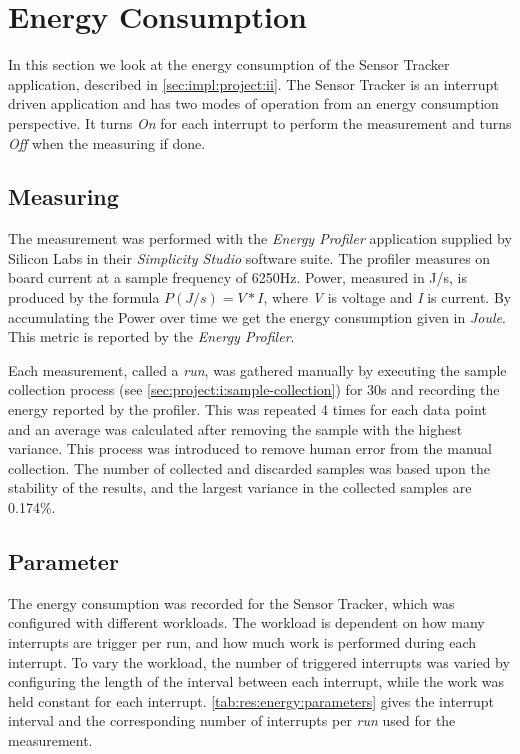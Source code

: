\section{Energy Consumption}

In this section we look at the energy consumption of the Sensor Tracker application, described in \autoref{sec:impl:project:ii}.
The Sensor Tracker is an interrupt driven application and has two modes of operation from an energy consumption perspective.
It turns \emph{On} for each interrupt to perform the measurement and turns \emph{Off} when the measuring if done.

\subsection{Measuring}
The measurement was performed with the \emph{Energy Profiler} application supplied by Silicon Labs in their \emph{Simplicity Studio} software suite.
The profiler measures on board current at a sample frequency of 6250Hz.
Power, measured in J/s, is produced by the formula $P (J/s) = V*I $, where \emph{V} is voltage and \emph{I} is current.
By accumulating the Power over time we get the energy consumption given in \emph{Joule}.
This metric is reported by the \emph{Energy Profiler}.

Each measurement, called a \emph{run}, was gathered manually by executing the sample collection process (see \autoref{sec:project:i:sample-collection}) for 30s and recording the energy reported by the profiler.
This was repeated 4 times for each data point and an average was calculated after removing the sample with the highest variance.
This process was introduced to remove human error from the manual collection.
The number of collected and discarded samples was based upon the stability of the results, and the largest variance in the collected samples are 0.174\%.

\subsection{Parameter}

The energy consumption was recorded for the Sensor Tracker, which was configured with different workloads.
The workload is dependent on how many interrupts are trigger per run, and how much work is performed during each interrupt.
To vary the workload, the number of triggered interrupts was varied by configuring the length of the interval between each interrupt, while the work was held constant for each interrupt.
\autoref{tab:res:energy:parameters} gives the interrupt interval and the corresponding number of interrupts per \emph{run} used for the measurement.


